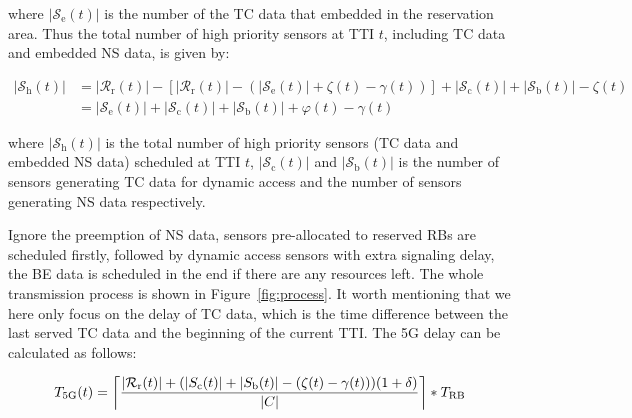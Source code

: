 \documentclass{SCIS2021}
\begin{document}
	\noindent where  $\left|\mathcal{S}_{\mathrm{e}}(t)\right|$ is the number of the TC data that embedded in the reservation area. Thus the total number of high priority sensors at TTI $t$, including TC data and embedded NS data, is given by:
	
	\setlength\abovedisplayskip{-13pt}
	\begin{center}
		\begin{equation}
			\begin{aligned}
				\left|\mathcal{S}_{\mathrm{h}}(t)\right| & =\left|\mathcal{R}_\mathrm{r}(t)\right|-\left[\left|\mathcal{R}_\mathrm{r}(t)\right|-\left(\left|\mathcal{S}_{\mathrm{e}}(t)\right|+\zeta(t)-\gamma(t)\right)\right]+\left|\mathcal{S}_{\mathrm{c}}(t)\right|+\left|\mathcal{S}_{\mathrm{b}}(t)\right|-\zeta(t) \\
				& = \left|\mathcal{S}_{\mathrm{e}}(t)\right| +\left|\mathcal{S}_{\mathrm{c}}(t)\right|+\left|\mathcal{S}_{\mathrm{b}}(t)\right| + \varphi(t) - \gamma(t)
			\end{aligned}
		\end{equation}
	\end{center}
	\setlength\belowdisplayskip{-8pt}
	
	\noindent where $\left|\mathcal{S}_{\mathrm{h}}(t)\right|$ is the total number of high priority sensors (TC data and embedded NS data) scheduled at TTI $t$, $\left|\mathcal{S}_{\mathrm{c}}(t)\right|$ and $\left|\mathcal{S}_{\mathrm{b}}(t)\right|$ is the number of sensors generating TC data for dynamic access and the number of sensors generating NS data respectively.
	
	\par Ignore the preemption of NS data, sensors pre-allocated to reserved RBs are scheduled firstly, followed by dynamic access sensors with extra signaling delay, the BE data is scheduled in the end if there are any resources left. The whole transmission process is shown in Figure~\ref{fig:process}. It worth mentioning that we here only focus on the delay of TC data, which is the time difference between the last served TC data and the beginning of the current TTI. The 5G delay can be calculated as follows:
	
	\setlength\abovedisplayskip{-13pt}
	\begin{center}
		\begin{equation}
			T_\text{5G}(t) = \bigg\lceil\frac{\arrowvert \mathcal{R}_{\mathrm{r}}(t) \arrowvert +(\arrowvert S_{\mathrm{c}}(t) \arrowvert + \arrowvert S_{\mathrm{b}}(t) \arrowvert -(\zeta(t) - \gamma(t)))(1+\delta) }{|C|} \bigg\rceil*T_\text{RB}
		\end{equation}
	\end{center}
	\setlength\belowdisplayskip{-8pt}
	
\end{document}
